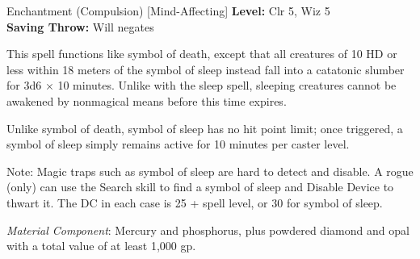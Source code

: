 {Enchantment (Compulsion) [Mind-Affecting]}
{
	\textbf{Level:}
	Clr 5, Wiz 5\\
	\textbf{Saving Throw:}
	Will negates\\
}
{
	This spell functions like symbol of death, except that all creatures of 10 HD or less within 18 meters of the symbol of sleep instead fall into a catatonic slumber for 3d6 $\times$ 10 minutes. Unlike with the sleep spell, sleeping creatures cannot be awakened by nonmagical means before this time expires.

	Unlike symbol of death, symbol of sleep has no hit point limit; once triggered, a symbol of sleep simply remains active for 10 minutes per caster level.

	Note: Magic traps such as symbol of sleep are hard to detect and disable. A rogue (only) can use the Search skill to find a symbol of sleep and Disable Device to thwart it. The DC in each case is 25 + spell level, or 30 for symbol of sleep.

	\textit{Material Component}:
	Mercury and phosphorus, plus powdered diamond and opal with a total value of at least 1,000 gp.

}
